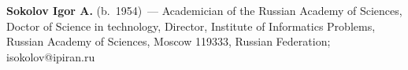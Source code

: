 \vspace*{3pt}

\noindent
\textbf{Sokolov Igor A.} (b.\ 1954)~--- Academician of the Russian Academy of Sciences, 
Doctor of Science in technology, Director, Institute of Informatics Problems, 
Russian Academy of Sciences, Moscow 119333, Russian Federation;  isokolov@ipiran.ru 

 \label{end\stat}

\renewcommand{\bibname}{\protect\rm Литература}  